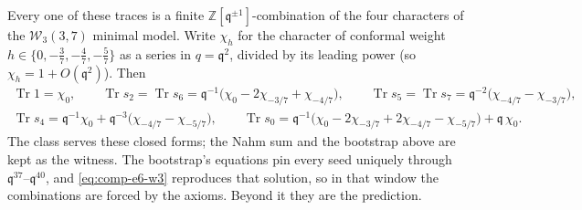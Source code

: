 \documentclass[11pt]{amsart}
\DeclareMathOperator{\Tr}{Tr}
\newcommand\fq{\mathfrak{q}}
\newcommand\bZ{\mathbb{Z}}
\theoremstyle{remark}
\begin{document}
Every one of these traces is a finite $\bZ[\fq^{\pm1}]$-combination of the four
characters of the $\mathcal W_3(3,7)$ minimal model.  Write $\chi_h$ for the
character of conformal weight $h\in\{0,-\tfrac37,-\tfrac47,-\tfrac57\}$ as a series
in $q=\fq^2$, divided by its leading power (so $\chi_h=1+O(\fq^2)$).  Then
\begin{equation}\label{eq:comp-e6-w3}
\begin{gathered}
  \Tr1=\chi_0,\qquad
  \Tr s_2=\Tr s_6=\fq^{-1}\bigl(\chi_0-2\chi_{-3/7}+\chi_{-4/7}\bigr),\qquad
  \Tr s_5=\Tr s_7=\fq^{-2}\bigl(\chi_{-4/7}-\chi_{-3/7}\bigr),\\
  \Tr s_4=\fq^{-1}\chi_0+\fq^{-3}\bigl(\chi_{-4/7}-\chi_{-5/7}\bigr),\qquad
  \Tr s_0=\fq^{-1}\bigl(\chi_0-2\chi_{-3/7}+2\chi_{-4/7}-\chi_{-5/7}\bigr)+\fq\,\chi_0 .
\end{gathered}
\end{equation}
The class serves these closed forms; the Nahm sum and the bootstrap above are
kept as the witness.  The bootstrap's equations pin every seed uniquely through
$\fq^{37}$--$\fq^{40}$, and \eqref{eq:comp-e6-w3} reproduces that solution, so
in that window the combinations are forced by the axioms.  Beyond it they are
the prediction.
\end{document}
